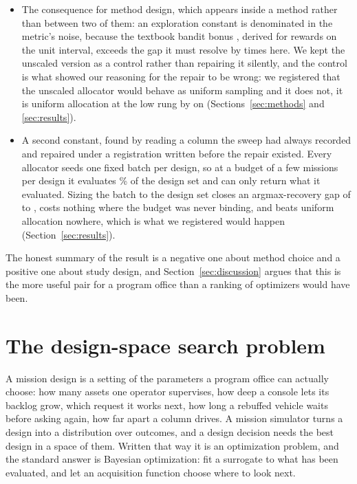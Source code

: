 \documentclass[11pt]{article}
\begin{document}
\begin{itemize}
      operating point) rather than of the metric, established by holding one design set fixed and
      scoring the same missions on three axes at four operating points (Section~\ref{sec:results}).
\item The consequence for method design, which appears inside a method rather than between two of
      them: an exploration constant is denominated in the metric's noise, because the textbook
      bandit bonus \citep{auer2002finite}, derived for rewards on the unit interval, exceeds the gap it must resolve by
      \BnBonusOverGapWorst{} times here. We kept the unscaled version as a control rather than
      repairing it silently, and the control is what showed our reasoning for the repair to be
      wrong: we registered that the unscaled allocator would behave as uniform sampling and it does
      not, it is \RsMOneWorstDir{} uniform allocation at the low rung by \RsMOneWorstMag{} on
      \RsMOneWorstField{} (Sections~\ref{sec:methods} and \ref{sec:results}).
\item A second constant, found by reading a column the sweep had always recorded and repaired under
      a registration written before the repair existed. Every allocator seeds one fixed batch per
      design, so at a budget of a few missions per design it evaluates \RsLowCoverAdapt{}\% of the
      design set and can only return what it evaluated. Sizing the batch to the design set closes an
      argmax-recovery gap of \WmUcbPooledWarmLowDeficitWas{} to \WmWorstDeficit{}, costs nothing
      where the budget was never binding, and beats uniform allocation nowhere, which is what we
      registered would happen (Section~\ref{sec:results}).
\end{itemize}

The honest summary of the result is a negative one about method choice and a positive one about
study design, and Section~\ref{sec:discussion} argues that this is the more useful pair for a
program office than a ranking of optimizers would have been.

\section{The design-space search problem}
\label{sec:problem}

A mission design is a setting of the parameters a program office can actually choose: how many
assets one operator supervises, how deep a console lets its backlog grow, which request it works
next, how long a rebuffed vehicle waits before asking again, how far apart a column drives. A
mission simulator turns a design into a distribution over outcomes, and a design decision needs the
best design in a space of them. Written that way it is an optimization problem, and the standard
answer is Bayesian optimization: fit a surrogate to what has been evaluated, and let an acquisition
function choose where to look next.
\end{document}
